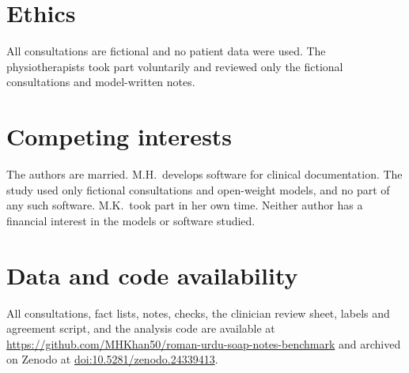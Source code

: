 \documentclass[11pt]{article}
\begin{document}
\section*{Ethics}
All consultations are fictional and no patient data were used. The physiotherapists took part voluntarily and reviewed only the fictional consultations and model-written notes.

\section*{Competing interests}
The authors are married. M.H.\ develops software for clinical documentation. The study used only fictional consultations and open-weight models, and no part of any such software. M.K.\ took part in her own time. Neither author has a financial interest in the models or software studied.

\section{Data and code availability}
All consultations, fact lists, notes, checks, the clinician review sheet, labels and agreement script, and the analysis code are available at \url{https://github.com/MHKhan50/roman-urdu-soap-notes-benchmark} and archived on Zenodo at \href{https://doi.org/10.5281/zenodo.24339413}{doi:10.5281/zenodo.24339413}.



\end{document}

